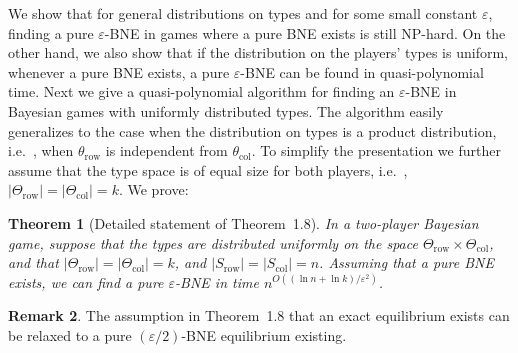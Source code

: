 \documentclass[10pt]{article}
\newtheorem{theorem}{Theorem}[section]
\theoremstyle{definition}
\newtheorem{remark}[theorem]{Remark}
\providecommand{\ie}{i.e.\ }
\numberwithin{equation}{section}
\newcommand{\eps}{\varepsilon}
\newcommand{\cclass}[1]{\textsf{#1}}
\newcommand{\Ta}{\Theta}
\newcommand{\ta}{\theta}
\begin{document}
We show that for general distributions on types and for some small constant $\eps$, finding a pure $\eps$-BNE 
in games where a pure BNE exists is still \cclass{NP}-hard. On the other hand, we also show that if the distribution on the
players' types is uniform, whenever a pure BNE exists,  a pure $\eps$-BNE can be found in quasi-polynomial time. 
\setcounter{subsection}{2}
Next we give a quasi-polynomial algorithm for finding an $\eps$-BNE in
Bayesian games with uniformly distributed types.  The algorithm easily
generalizes to the case when the distribution on types is a product
distribution, \ie, when $\ta_{\mathrm{row}}$ is independent from
$\ta_\mathrm{col}$.  To simplify the presentation we further assume
that the type space is of equal size for both players,
\ie, $|\Ta_{\mathrm{row}}|=|\Ta_\mathrm{col}|=k$.  We prove:

\begin{theorem}[Detailed statement of Theorem~1.8]
\label{thm:BNEeasy-formal} In a two-player Bayesian game,
suppose that the types are distributed uniformly on the space $\Ta_{\mathrm{row}}\times\Ta_\mathrm{col}$, and that $|\Ta_{\mathrm{row}}|=|\Ta_\mathrm{col}|=k$, and $|S_{\mathrm{row}}|=|S_\mathrm{col}|=n$. 
Assuming that a pure BNE exists, we can find a pure $\eps$-BNE in time $n^{O((\ln n+\ln k)/\eps^2)}$. 
\end{theorem}

\begin{remark}
  The assumption in Theorem~1.8 that an exact equilibrium exists can be relaxed to a pure $(\eps/2)$-BNE equilibrium existing.
\end{remark}
\end{document}
